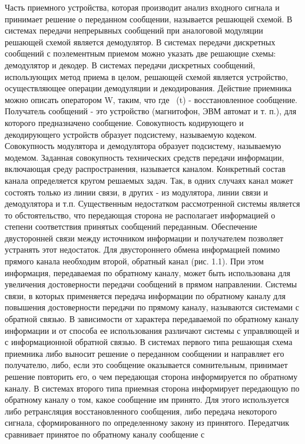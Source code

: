 ﻿\documentclass[a4paper,12pt]{article}
\begin{document}
Часть приемного устройства, которая производит анализ входного сигнала и принимает решение о переданном сообщении, называется решающей схемой. В системах передачи непрерывных сообщений при аналоговой модуляции решающей схемой является демодулятор. В системах передачи дискретных сообщений с поэлементным приемом можно указать две решающие схемы: демодулятор и декодер. В системах передачи дискретных сообщений, использующих метод приема в целом, решающей схемой является устройство, осуществляющее операции демодуляции и декодирования. Действие приемника можно описать оператором W, таким, что
где ~(t) - восстановленное сообщение.
Получатель сообщений - это устройство (магнитофон, ЭВМ автомат и т. п.), для которого предназначено сообщение.
Совокупность кодирующего и декодирующего устройств образует подсистему, называемую кодеком. Совокупность модулятора и демодулятора образует подсистему, называемую модемом. Заданная совокупность технических средств передачи информации, включающая среду распространения, называется каналом. Конкретный состав канала определяется кругом решаемых задач. Так, в одних случаях канал может состоять только из линии связи, в других - из модулятора, линии связи и демодулятора и т.п.
Существенным недостатком рассмотренной системы является то обстоятельство, что передающая сторона не располагает информацией о степени соответствия принятых сообщений переданным. Обеспечение двусторонней связи между источником информации и получателем позволяет устранять этот недостаток. Для двустороннего обмена информацией помимо прямого канала необходим второй, обратный канал (рис. 1.1). При этом информация, передаваемая по обратному каналу, может быть использована для увеличения достоверности передачи сообщений в прямом направлении.
Системы связи, в которых применяется передача информации по обратному каналу для повышения достоверности передачи по прямому каналу, называются системами с обратной связью. В зависимости от характера передаваемой по обратному каналу информации и от способа ее использования различают системы с управляющей и с информационной обратной связью. В системах первого типа решающая схема приемника либо выносит решение о переданном сообщении и направляет его получателю, либо, если это сообщение оказывается сомнительным, принимает решение повторить его, о чем передающая сторона информируется по обратному каналу. В системах второго типа приемная сторона информирует передающую по обратному каналу о том, какое сообщение им принято. Для этого используется либо ретрансляция восстановленного сообщения, либо передача некоторого сигнала, сформированного по определенному закону из принятого. Передатчик сравнивает принятое по обратному каналу сообщение с
\end{document}
